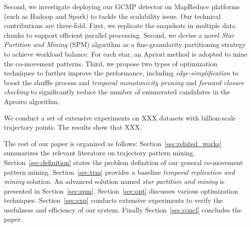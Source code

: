 


%

Second, we investigate deploying our GCMP detector on MapReduce platforms (such as Hadoop and Spark) to tackle the scalability issue. Our technical contributions are three-fold. First, we replicate the snapshots in multiple data chunks to support efficient parallel processing. Second, we devise a novel \emph{Star Partition and Mining} (SPM) algorithm as a fine-granularity partitioning strategy to achieve workload balance. For each star, an Apriori method is adopted to mine the co-movement patterns. Third, we propose two types of optimization techniques to further improve the performance, including \emph{edge-simplification} to boost the shuffle process and \emph{temporal monotonicity pruning} and 
\emph{forward closure checking} to significantly reduce the number of enumerated candidates in the Aproiro algorithm.


We conduct a set of extensive experiments on XXX datasets with billion-scale trajectory points. The results show that XXX.

The rest of our paper is organized as follows: Section~\ref{sec:related_works} summarizes the relevant literature on 
trajectory pattern mining. Section~\ref{sec:definition} states the problem definition of our general co-movement pattern mining. Section~\ref{sec:trm} provides a baseline \emph{temporal replication and mining} solution. An advanced solution named
\emph{star partition and mining} is presented in Section~\ref{sec:spm}. Section~\ref{sec:opt} discusses various optimization techniques. Section~\ref{sec:exp} conducts extensive experiments to verify the usefulness and efficiency of our system. Finally Section~\ref{sec:concl} concludes the paper.
